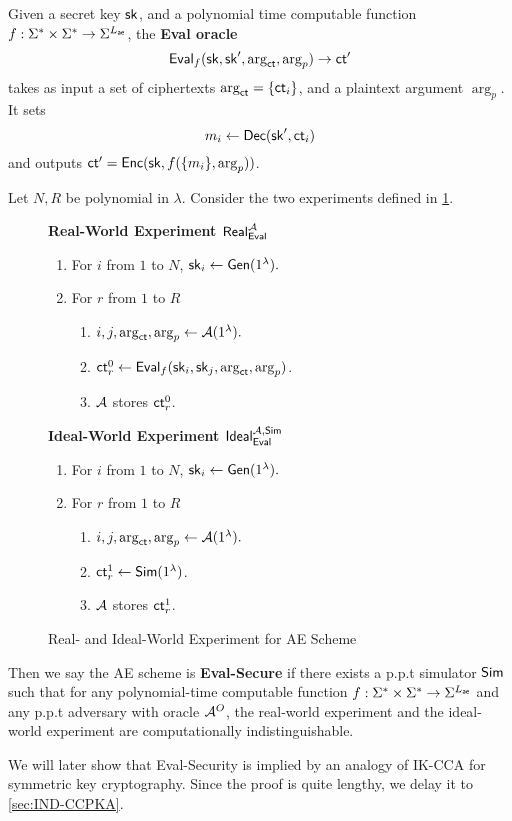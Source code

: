 \begin{definition}
\label{defn:AE-eval-oracle}
Given a secret key ${\mathsf{sk}}$, and a polynomial time computable function $f: \Sigma^* \times \Sigma^* \to \Sigma^{L_{\mathsf{ae}}}$, the \textbf{Eval oracle} 
$$\mathsf{Eval}_{f}({\mathsf{sk}}, {\mathsf{sk}}', \arg_{\mathsf{ct}}, \arg_p) \to \mathsf{ct}'$$ takes as input a set of ciphertexts $\arg_{\mathsf{ct}} = \{\mathsf{ct}_i\}$, and a plaintext argument $\arg_{p}$. It sets 
$$m_i \leftarrow \mathsf{Dec}({\mathsf{sk}}', \mathsf{ct}_i)$$ 
and outputs $\mathsf{ct}' = \mathsf{Enc}({\mathsf{sk}}, f(\{m_i\}, \arg_p))$.
\end{definition}
\begin{definition}
\label{defn:AE-eval-security}
Let $N, R$ be polynomial in $\lambda$. Consider the two experiments defined in \cref{expr:AE-real-ideal-world}.

\begin{figure}[ht!]
\begin{framed}
\textbf{Real-World Experiment $\mathsf{Real}_{\mathsf{Eval}}^{\mathcal{A}}$}
\begin{enumerate}
    \item For $i$ from $1$ to $N$, ${\mathsf{sk}}_i \leftarrow \mathsf{Gen}(1^{\lambda}).$
    \item For $r$ from $1$ to $R$
    \begin{enumerate}
        \item $i, j, \arg_{\mathsf{ct}}, \arg_p \leftarrow \mathcal{A}(1^{\lambda}).$
        \item $\mathsf{ct}^{0}_r \leftarrow \mathsf{Eval}_f({\mathsf{sk}}_i, {\mathsf{sk}}_j, \arg_{\mathsf{ct}}, \arg_p)$.
        \item $\mathcal{A}$ stores $\mathsf{ct}^{0}_r$.
    \end{enumerate}
\end{enumerate}
\textbf{Ideal-World Experiment $\mathsf{Ideal}_{\mathsf{Eval}}^{\mathcal{A}, \mathsf{Sim}}$}
\begin{enumerate}
    \item For $i$ from $1$ to $N$, ${\mathsf{sk}}_i \leftarrow \mathsf{Gen}(1^{\lambda}).$
    \item For $r$ from $1$ to $R$
    \begin{enumerate}
        \item $i, j, \arg_{\mathsf{ct}}, \arg_p \leftarrow \mathcal{A}(1^{\lambda}).$
        \item $\mathsf{ct}^{1}_r \leftarrow \mathsf{Sim}(1^{\lambda})$.
        \item $\mathcal{A}$ stores $\mathsf{ct}^{1}_r$.
    \end{enumerate}
\end{enumerate}
\end{framed}
\caption{Real- and Ideal-World Experiment for AE Scheme}
\label{expr:AE-real-ideal-world}
\end{figure}

Then we say the AE scheme is \textbf{Eval-Secure} if there exists a p.p.t simulator $\mathsf{Sim}$ such that for any polynomial-time computable function $f: \Sigma^* \times \Sigma^* \to \Sigma^{L_{\mathsf{ae}}}$ and any p.p.t adversary with oracle $\mathcal{A}^O$, the real-world experiment and the ideal-world experiment are computationally indistinguishable.
\end{definition}
We will later show that Eval-Security is implied by an analogy of IK-CCA \cite[Definition 1]{BBDP01keyprivate} for symmetric key cryptography. Since the proof is quite lengthy, we delay it to \cref{sec:IND-CCPKA}.

